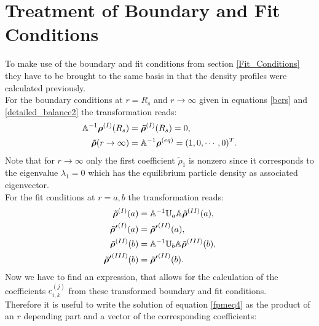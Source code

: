 \section{Treatment of Boundary and Fit Conditions}
\label{Treatment_of_Boundary_and_Fit_Conditions}
To make use of the boundary and fit conditions from section \ref{Fit_Conditions} they have to be brought to the same basis in that the density profiles were calculated previously. \\
For the boundary conditions at $r=R_s$ and $r \rightarrow \infty$ given in equations \eqref{bcrs} and \eqref{detailed_balance2} the transformation reads:
\begin{align}
    \mathbb{A}^{-1}\boldsymbol{\mathbf{\rho}}^{(I)}(R_s) &= \boldsymbol{\mathbf{\tilde{\rho}}}^{(I)}(R_s) = 0, \nonumber \\
    \boldsymbol{\mathbf{\tilde{\rho}}}(r \rightarrow \infty) &= \mathbb{A}^{-1} \boldsymbol{\mathbf{\rho}}^{(eq)} = (1,0,\cdots,0)^{T}.
\end{align}
Note that for $r\rightarrow \infty$ only the first coefficient $\tilde{\rho}_1$ is nonzero since it corresponds to the eigenvalue $\lambda_1=0$ which has the equilibrium particle density as associated eigenvector.\\
For the fit conditions at $r=a,b$ the transformation reads:
\begin{align}
    \boldsymbol{\mathbf{\tilde{\rho}}}^{(I)}(a) &= \mathbb{A}^{-1}\mathbb{U}_a\mathbb{A} \boldsymbol{\mathbf{\tilde{\rho}}}^{(II)}(a), \\ \nonumber
    \boldsymbol{\mathbf{\tilde{\rho} '}}^{(I)}(a) &= \boldsymbol{\mathbf{\tilde{\rho} '}}^{(II)}(a), \\ \nonumber
    \boldsymbol{\mathbf{\tilde{\rho}}}^{(II)}(b) &= \mathbb{A}^{-1}\mathbb{U}_b\mathbb{A} \boldsymbol{\mathbf{\tilde{\rho}}}^{(III)}(b), \\ \nonumber
    \boldsymbol{\mathbf{\tilde{\rho} '}}^{(III)}(b) &= \boldsymbol{\mathbf{\tilde{\rho} '}}^{(II)}(b).
\end{align}
Now we have to find an expression, that allows for the calculation of the coefficients $c_{i,k}^{(j)}$ from these transformed boundary and fit conditions.\\
Therefore it is useful to write the solution of equation \eqref{fpmeq4} as the product of an $r$ depending part and a vector of the corresponding coefficients:
